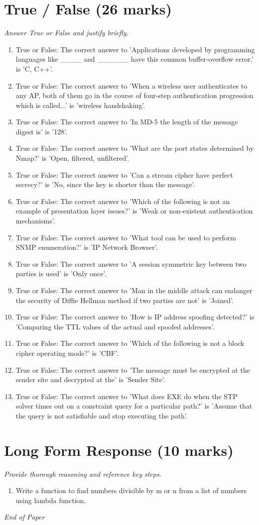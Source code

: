 \documentclass[12pt]{article}
\begin{document}
\section*{True / False (26 marks)}
\textit{Answer True or False and justify briefly.}
\begin{enumerate}[label=\arabic*.]
\item True or False: The correct answer to 'Applications developed by programming languages like \_\_\_\_ and \_\_\_\_\_\_ have this common buffer-overflow error.' is 'C, C++'.
\item True or False: The correct answer to 'When a wireless user authenticates to any AP, both of them go in the course of four-step authentication progression which is called...' is 'wireless handshaking'.
\item True or False: The correct answer to 'In MD-5 the length of the message digest is' is '128'.
\item True or False: The correct answer to 'What are the port states determined by Nmap?' is 'Open, filtered, unfiltered'.
\item True or False: The correct answer to 'Can a stream cipher have perfect secrecy?' is 'No, since the key is shorter than the message'.
\item True or False: The correct answer to 'Which of the following is not an example of presentation layer issues?' is 'Weak or non-existent authentication mechanisms'.
\item True or False: The correct answer to 'What tool can be used to perform SNMP enumeration?' is 'IP Network Browser'.
\item True or False: The correct answer to 'A session symmetric key between two parties is used' is 'Only once'.
\item True or False: The correct answer to 'Man in the middle attack can endanger the security of Diffie Hellman method if two parties are not' is 'Joined'.
\item True or False: The correct answer to 'How is IP address spoofing detected?' is 'Comparing the TTL values of the actual and spoofed addresses'.
\item True or False: The correct answer to 'Which of the following is not a block cipher operating mode?' is 'CBF'.
\item True or False: The correct answer to 'The message must be encrypted at the sender site and decrypted at the' is 'Sender Site'.
\item True or False: The correct answer to 'What does EXE do when the STP solver times out on a constraint query for a particular path?' is 'Assume that the query is not satisfiable and stop executing the path'.
\end{enumerate}

\section*{Long Form Response (10 marks)}
\textit{Provide thorough reasoning and reference key steps.}
\begin{enumerate}[label=\arabic*.]
\item Write a function to find numbers divisible by m or n from a list of numbers using lambda
function.
\end{enumerate}

\vfill
\noindent\textit{End of Paper}
\end{document}
